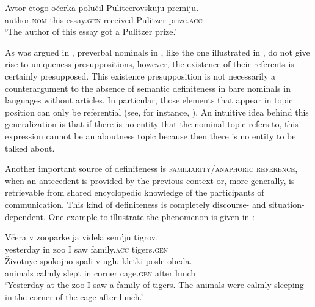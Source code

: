 \documentclass[output=paper]{langscibook}
\begin{document}
\ea \label{ex:seres:32}
\gll	Avtor				ėtogo		očerka		polučil		Pulitcerovskuju	premiju. \\
       	author.\textsc{nom} 	this		essay.\textsc{gen} 	received 	Pulitzer 				prize.\textsc{acc}\\
       	\glt `The author of this essay got a Pulitzer prize.'
    \z

\noindent As was argued in , preverbal nominals in , like the one illustrated in , do not give rise to uniqueness presuppositions, however, the existence of their referents is certainly presupposed. This existence presupposition
is not necessarily a counterargument to the absence of semantic definiteness in bare nominals in languages without articles. In particular, those elements that appear in topic position can only be referential (see, for instance, \citealt{Reinhart1981,Erteschik-Shir1998,Endriss2009}). An intuitive idea behind this generalization is that if there is no entity that the nominal topic refers to, this expression cannot be an aboutness topic because then there is no entity to be talked about. %

Another important source of definiteness is \textsc{familiarity/anaphoric reference}, when an antecedent is provided by the previous context or, more generally, is retrievable from shared encyclopedic knowledge of the participants of communication.
This kind of definiteness is completely discourse- and situation-dependent. One example to illustrate the phenomenon is given in :

\ea \label{ex:seres:33}
\gll	Včera			v	zooparke	ja	videla	sem'ju		tigrov.\\
	yesterday	in	zoo          	I	saw		family.\textsc{acc}	tigers.\textsc{gen}\\
	\gll Životnye	spokojno	spali	v	uglu		kletki			posle	obeda.\\
	animals		calmly      	slept	in	corner	cage.\textsc{gen} 	after	lunch\\
\glt `Yesterday at the zoo I saw a family of tigers. The animals were calmly sleeping in the corner of the cage after lunch.'
\z
\end{document}
